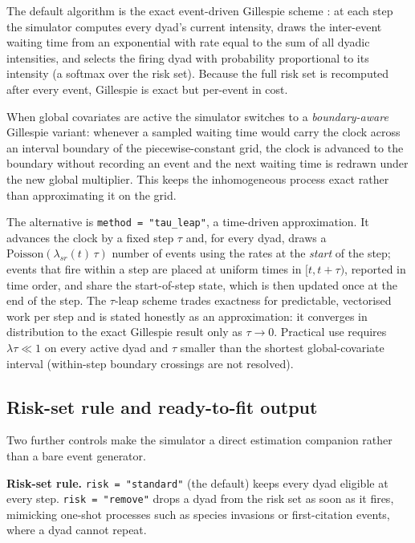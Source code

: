 The default algorithm is the exact event-driven Gillespie scheme
\citep{gillespie1977}: at each step the simulator computes every dyad's
current intensity, draws the inter-event waiting time from an exponential
with rate equal to the sum of all dyadic intensities, and selects the
firing dyad with probability proportional to its intensity (a softmax over
the risk set). Because the full risk set is recomputed after every event,
Gillespie is exact but per-event in cost.

When global covariates are active the simulator switches to a
\emph{boundary-aware} Gillespie variant: whenever a sampled waiting time
would carry the clock across an interval boundary of the
piecewise-constant grid, the clock is advanced to the boundary without
recording an event and the next waiting time is redrawn under the new
global multiplier. This keeps the inhomogeneous process exact rather than
approximating it on the grid.

The alternative is \texttt{method = "tau\_leap"}, a time-driven
approximation. It advances the clock by a fixed step $\tau$ and, for every
dyad, draws a $\mathrm{Poisson}(\lambda_{sr}(t)\,\tau)$ number of events
using the rates at the \emph{start} of the step; events that fire within a
step are placed at uniform times in $[t, t+\tau)$, reported in time order,
and share the start-of-step state, which is then updated once at the end
of the step. The $\tau$-leap scheme trades exactness for predictable,
vectorised work per step and is stated honestly as an approximation: it
converges in distribution to the exact Gillespie result only as
$\tau \to 0$. Practical use requires $\lambda\tau \ll 1$ on every active
dyad and $\tau$ smaller than the shortest global-covariate interval
(within-step boundary crossings are not resolved).

\subsection{Risk-set rule and ready-to-fit output}
\label{sec:sim-output}

Two further controls make the simulator a direct estimation companion
rather than a bare event generator.

\textbf{Risk-set rule.} \texttt{risk = "standard"} (the default) keeps
every dyad eligible at every step. \texttt{risk = "remove"} drops a dyad
from the risk set as soon as it fires, mimicking one-shot processes such
as species invasions or first-citation events, where a dyad cannot repeat.

